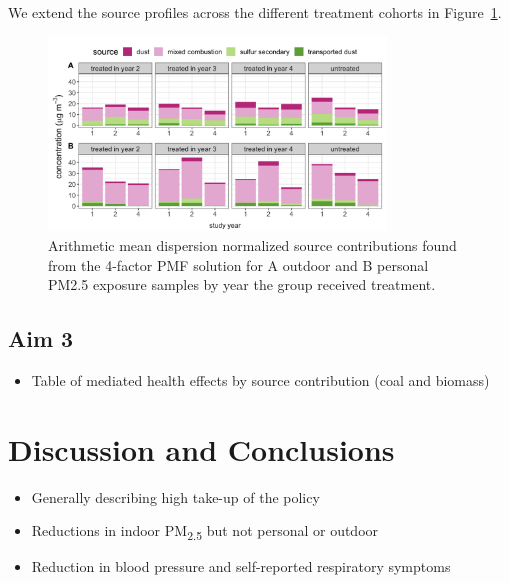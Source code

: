 \documentclass[
  letterpaper,
  DIV=11,
  numbers=noendperiod]{scrartcl}
\providecommand{\tightlist}{%
  \setlength{\itemsep}{0pt}\setlength{\parskip}{0pt}}\usepackage{longtable,booktabs,array}
\begin{document}
We extend the source profiles across the different treatment cohorts in
Figure~\ref{fig-source-season}.

\begin{figure}[H]

{\centering \includegraphics[width=0.8\textwidth,height=\textheight]{images/source-season.png}

}

\caption{\label{fig-source-season}Arithmetic mean dispersion normalized
source contributions found from the 4-factor PMF solution for A outdoor
and B personal PM2.5 exposure samples by year the group received
treatment.}

\end{figure}

\hypertarget{aim-3}{%
\subsection{Aim 3}\label{aim-3}}

\begin{itemize}
\tightlist
\item
  Table of mediated health effects by source contribution (coal and
  biomass)
\end{itemize}

\hypertarget{discussion-and-conclusions}{%
\section{Discussion and Conclusions}\label{discussion-and-conclusions}}

\begin{itemize}
\tightlist
\item
  Generally describing high take-up of the policy
\item
  Reductions in indoor PM\textsubscript{2.5} but not personal or outdoor
\item
  Reduction in blood pressure and self-reported respiratory symptoms
\end{itemize}
\end{document}
